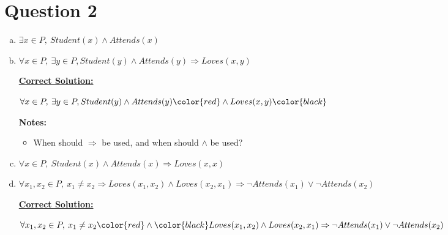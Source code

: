 \documentclass[12pt]{article}
\begin{document}
\section*{Question 2}
\begin{enumerate}[a.]
    \item $\exists x \in P,\:Student(x) \land Attends(x)$
    \item

    $\forall x \in P,\:\exists y \in P, Student(y) \land Attends(y) \Rightarrow Loves(x,y)$

    \begin{mdframed}
        \underline{\textbf{Correct Solution:}}

        \bigskip

        $\forall x \in P,\:\exists y \in P, Student(y) \land Attends(y) \color{red}\land Loves(x,y)\color{black}$
    \end{mdframed}

    \textbf{Notes:}
    \begin{itemize}
        \item When should $\Rightarrow$ be used, and when should $\land$ be used?
    \end{itemize}

    \item

    $\forall x \in P,\: Student(x) \land Attends(x) \Rightarrow Loves(x,x)$

    \item

    $\forall x_1,x_2 \in P,\: x_1 \neq x_2 \Rightarrow Loves(x_1,x_2) \land
    Loves(x_2,x_1) \Rightarrow \neg Attends(x_1) \lor \neg Attends(x_2)$

    \begin{mdframed}
        \underline{\textbf{Correct Solution:}}

        \bigskip

        $\forall x_1,x_2 \in P,\: x_1 \neq x_2 \color{red}\land\color{black} Loves(x_1,x_2) \land
        Loves(x_2,x_1) \Rightarrow \neg Attends(x_1) \lor \neg Attends(x_2)$
    \end{mdframed}
\end{enumerate}
\end{document}
